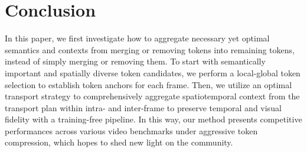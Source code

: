 \section{Conclusion}
\label{sec:conclusion}

In this paper, we first investigate how to aggregate necessary yet optimal semantics and contexts from merging or removing tokens into remaining tokens, instead of simply merging or removing them. To start with semantically important and spatially diverse token candidates, we perform a local-global token selection to establish token anchors for each frame. Then, we utilize an optimal transport strategy to comprehensively aggregate spatiotemporal context from the transport plan within intra- and inter-frame to preserve temporal and visual fidelity with a training-free pipeline. In this way, our method presents competitive performances across various video benchmarks under aggressive token compression, which hopes to shed new light on the community. 


\clearpage